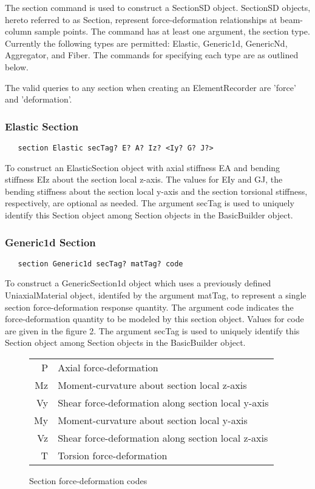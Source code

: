 \documentclass[12pt]{article}
\begin{document}
The section command is used to construct a SectionSD object. SectionSD
objects, hereto referred to as Section, represent force-deformation
relationships at beam-column sample points. The command has at least
one argument, the section type. Currently the following types are
permitted: Elastic, Generic1d, GenericNd, Aggregator, and Fiber. The
commands for specifying each type are as outlined below.

The valid queries to any section when creating an ElementRecorder
are 'force' and 'deformation'.

\subsubsection{Elastic Section}
{\sf\small
\begin{verbatim}
   section Elastic secTag? E? A? Iz? <Iy? G? J?>
\end{verbatim}
}

To construct an ElasticSection object with axial stiffness EA and 
bending stiffness EIz about the section local z-axis. The values 
for EIy and GJ, the bending stiffness about the section local
y-axis and the section torsional stiffness, respectively, are optional
as needed. The argument secTag is used to uniquely identify this 
Section object among Section objects in the BasicBuilder object.

\subsubsection{Generic1d Section}
{\sf\small
\begin{verbatim}
   section Generic1d secTag? matTag? code
\end{verbatim}
}

To construct a GenericSection1d object which uses a previously defined
UniaxialMaterial object, identifed by the argument matTag, to represent
a single section force-deformation response quantity. The argument code indicates
the force-deformation quantity to be modeled by this section object.
Values for code are given in the figure 2. The 
argument secTag is used to uniquely identify this Section object among 
Section objects in the BasicBuilder object. 

\begin{figure}[htpb]
\begin{center}
\begin{tabular}{||r|l||} \hline
 P & Axial force-deformation \\
 Mz & Moment-curvature about section local z-axis \\
 Vy & Shear force-deformation along section local y-axis \\
 My & Moment-curvature about section local y-axis \\
 Vz & Shear force-deformation along section local z-axis \\
 T & Torsion force-deformation \\ \hline
\end{tabular}
\caption{Section force-deformation codes}
\label{sectionCodes}
\end{center}
\end{figure}
\end{document}
